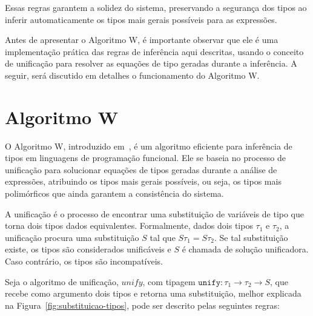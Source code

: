 Essas regras garantem a solidez do sistema, preservando a segurança dos tipos ao inferir automaticamente os tipos mais gerais possíveis para as expressões.

Antes de apresentar o Algoritmo W, é importante observar que ele é uma implementação prática das regras de inferência aqui descritas, usando o conceito de unificação para resolver as equações de tipo geradas durante a inferência.
A seguir, será discutido em detalhes o funcionamento do Algoritmo W.

\section{Algoritmo W}\label{sec:w-algo}

O Algoritmo W, introduzido em~, é um algoritmo eficiente para inferência de tipos em linguagens de programação funcional.
Ele se baseia no processo de unificação para solucionar equações de tipos geradas durante a análise de expressões, atribuindo os tipos mais gerais possíveis, ou seja, os tipos mais polimórficos que ainda garantem a consistência do sistema.

A unificação é o processo de encontrar uma substituição de variáveis de tipo que torna dois tipos dados equivalentes.
Formalmente, dados dois tipos $\tau_1$ e $\tau_2$, a unificação procura uma substituição $S$ tal que $S\tau_1 = S\tau_2$.
Se tal substituição existe, os tipos são considerados unificáveis e $S$ é chamada de solução unificadora.
Caso contrário, os tipos são incompatíveis.

Seja o algoritmo de unificação, $unify$, com tipagem $\texttt{unify} : \tau_1 \to \tau_2 \to S$, que recebe como argumento dois tipos e retorna uma substituição, melhor explicada na Figura~\ref{fig:substituicao-tipos}, pode ser descrito pelas seguintes regras:

